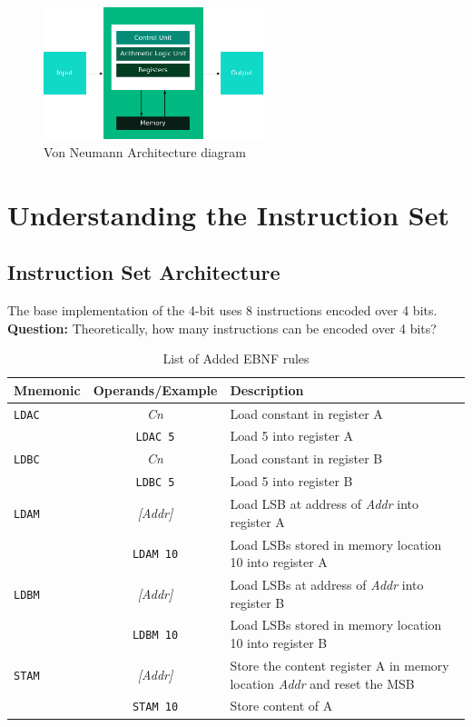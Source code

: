 \documentclass[a4paper, 11pt]{article}
\begin{document}
\begin{figure}[H]
    \centering
    \includegraphics[width =0.57\textwidth]{Images/von-neuman-arch.png}
    \caption{Von Neumann Architecture diagram}
    \label{fig:vn-arch}
\end{figure}

\section{Understanding the Instruction Set}
\subsection{Instruction Set Architecture}
The base implementation of the 4-bit uses 8 instructions encoded over 4 bits. \\
\textbf{Question:} Theoretically, how many instructions can be encoded over 4 bits? \\
\begin{table}[H]
\centering
\begin{tabularx}{\textwidth}{|l c X|}
  \hline

  Mnemonic & Operands/Example & Description \\
  \hline

\verb|LDAC| & \textit{Cn} & Load constant in register A \\
& \verb|LDAC 5| & Load 5 into register A\\
  \hline
  \verb|LDBC| & \textit{Cn} & Load constant in register B \\
& \verb|LDBC 5| & Load 5 into register B\\
  \hline
  \verb|LDAM| & \textit{[Addr]} & Load LSB at address of \textit{Addr} into register A \\
& \verb|LDAM 10| & Load LSBs stored in memory location 10 into register A\\
  \hline
    \verb|LDBM| & \textit{[Addr]} & Load LSBs at address of \textit{Addr} into register B \\
& \verb|LDBM 10| & Load LSBs stored in memory location 10 into register B\\
  \hline
  \verb|STAM| & \textit{[Addr]} & Store the content register A in memory location \textit{Addr} and reset the MSB\\
& \verb|STAM 10| & Store content of A\\
\hline

\end{tabularx}
 \caption{List of Added EBNF rules \citep{EBNF}}
 \label{Table-3}
 \end{table} 
 
\end{document}
